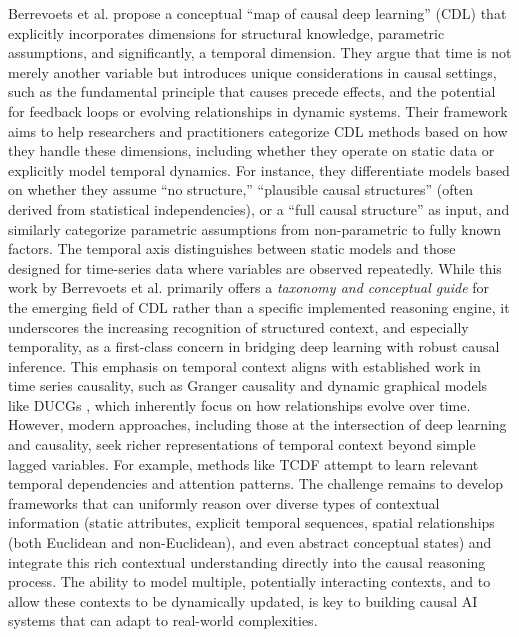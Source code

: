 {Berrevoets et al. \cite{berrevoets2022navigatingcausaldeeplearning, berrevoets2024causaldeeplearning} propose a conceptual ``map of causal deep learning'' (CDL) that explicitly incorporates dimensions for structural knowledge, parametric assumptions, and significantly, a temporal dimension. They argue that time is not merely another variable but introduces unique considerations in causal settings, such as the fundamental principle that causes precede effects, and the potential for feedback loops or evolving relationships in dynamic systems. Their framework aims to help researchers and practitioners categorize CDL methods based on how they handle these dimensions, including whether they operate on static data or explicitly model temporal dynamics. For instance, they differentiate models based on whether they assume ``no structure,'' ``plausible causal structures'' (often derived from statistical independencies), or a ``full causal structure'' as input, and similarly categorize parametric assumptions from non-parametric to fully known factors. The temporal axis distinguishes between static models and those designed for time-series data where variables are observed repeatedly. While this work by Berrevoets et al. primarily offers a \textit{taxonomy and conceptual guide} for the emerging field of CDL rather than a specific implemented reasoning engine, it underscores the increasing recognition of structured context, and especially temporality, as a first-class concern in bridging deep learning with robust causal inference.
This emphasis on temporal context aligns with established work in time series causality, such as Granger causality \cite{Granger1969Investigating} and dynamic graphical models like DUCGs \cite{Zhang2012Dynamic}, which inherently focus on how relationships evolve over time. However, modern approaches, including those at the intersection of deep learning and causality, seek richer representations of temporal context beyond simple lagged variables. For example, methods like TCDF \cite{Nauta2019Causal} attempt to learn relevant temporal dependencies and attention patterns. The challenge remains to develop frameworks that can uniformly reason over diverse types of contextual information (static attributes, explicit temporal sequences, spatial relationships (both Euclidean and non-Euclidean), and even abstract conceptual states) and integrate this rich contextual understanding directly into the causal reasoning process. The ability to model multiple, potentially interacting contexts, and to allow these contexts to be dynamically updated, is key to building causal AI systems that can adapt to real-world complexities.


}
